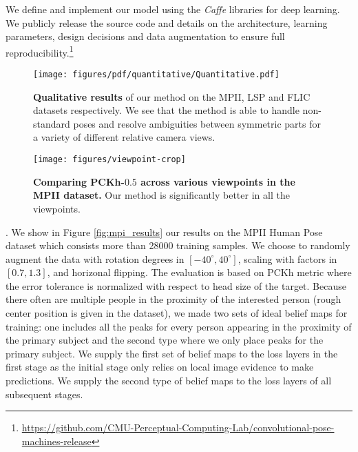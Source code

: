 \documentclass[10pt,twocolumn,letterpaper]{article}
\begin{document}
We define and implement our model using the \emph{Caffe}\cite{jia2014caffe} libraries for deep learning. We publicly release the source code and details on the architecture, learning parameters, design decisions and data augmentation to ensure full reproducibility.\footnote{\url{https://github.com/CMU-Perceptual-Computing-Lab/convolutional-pose-machines-release}}\begin{figure*}[ht!]
    \centering
    \texttt{[image: figures/pdf/quantitative/Quantitative.pdf]}
    \vspace{-5pt}
    \caption{\textbf{Qualitative results} of our method on the MPII, LSP and FLIC datasets respectively.  We see that the method is able to handle non-standard poses and resolve ambiguities between symmetric parts for a variety of different relative camera views.}
    \label{fig:leeds_qualitative}
\end{figure*}\begin{figure}[ht!]
    \centering
    \texttt{[image: figures/viewpoint-crop]}
    \vspace{-10pt}
    \caption{\textbf{Comparing PCKh-$0.5$ across various viewpoints in the MPII dataset.} Our method is significantly better in all the viewpoints.}
    \label{fig:mpi_vp}
\end{figure}. We show in Figure \ref{fig:mpi_results} our results on the MPII Human Pose dataset \cite{andriluka14cvpr} which consists more than 28000 training samples. 
We choose to randomly augment the data with rotation degrees in $[-40^{\circ},40^{\circ}]$, scaling with factors in $[0.7,1.3]$, and horizonal flipping.
The evaluation is based on PCKh metric \cite{andriluka14cvpr} where the error tolerance is normalized with respect to head size of the target. Because there often are multiple people in the proximity of the interested person (rough center position is given in the dataset), we made two sets of ideal belief maps for training: 
one includes all the peaks for every person appearing in the proximity of the primary subject and the second type where we only place peaks for the primary subject.  We supply the first set of belief maps to the loss layers in the first stage as the initial stage only relies on local image evidence to make predictions. We supply the second type of belief maps to the loss layers of all subsequent stages.
\end{document}
